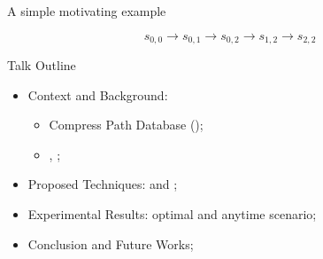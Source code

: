 \begin{frame}{A simple motivating example}
\begin{minipage}{0.45\textwidth}
        $$s_{0,0} \rightarrow s_{0,1} \rightarrow s_{0,2} \rightarrow s_{1,2} \rightarrow s_{2,2}$$
    \end{minipage}
\end{frame}

\begin{frame}{Talk Outline}
    \begin{itemize}
        \item Context and Background:
        \begin{itemize}
            \item Compress Path Database (\CPD{});
            \item \ALT{}, \AWA{};
        \end{itemize}
        \item Proposed Techniques: \CPDSearch{} and \anytimeCPDSearch{};
        \item Experimental Results: optimal and anytime scenario;
        \item Conclusion and Future Works;
    \end{itemize}
\end{frame}